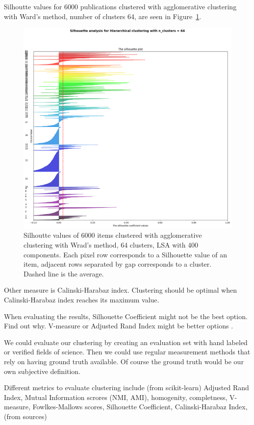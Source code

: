 Silhoutte values for 6000 publications clustered with 
agglomerative clustering with Ward's method, number of clusters 
64, are seen in Figure~\ref{fig:silh01}.
\begin{figure}[ht]
  \begin{center}    
\includegraphics[width=13cm]{images/6000-64-400-Hierarchical-silhouette-plot.png}
    \caption{Silhoutte values of 6000 items clustered with 
    agglomerative clustering with Wrad's method, 64 clusters, 
    LSA with 400 components. Each pixel row corresponds to a 
    Silhouette value of an item, adjacent rows separated by gap 
    corresponds to a cluster.
    Dashed line is the average.}
    \label{fig:silh01}
  \end{center}
\end{figure}

Other measure is Calinski-Harabaz index. Clustering should be 
optimal when Calinski-Harabaz index reaches its maximum value. 
\cite{}

When evaluating the results, Silhouette Coefficient might not be
the best option. Find out why. V-measure or Adjusted Rand Index
might be better options \cite{noauthor_clustering_nodate}.

We could evaluate our clustering by creating an evaluation set with
hand labeled or verified fields of science. Then we could use
regular measurement methods that rely on having ground truth 
available. Of course the ground truth would be our own subjective 
definition. 

Different metrics to evaluate clustering include (from 
scikit-learn) Adjusted Rand Index, Mutual Information scrores 
(NMI, AMI), homogenity, completness, V-measure, Fowlkes-Mallows 
scores, Silhouette Coefficient, Calinski-Harabaz Index, (from 
sources) 

